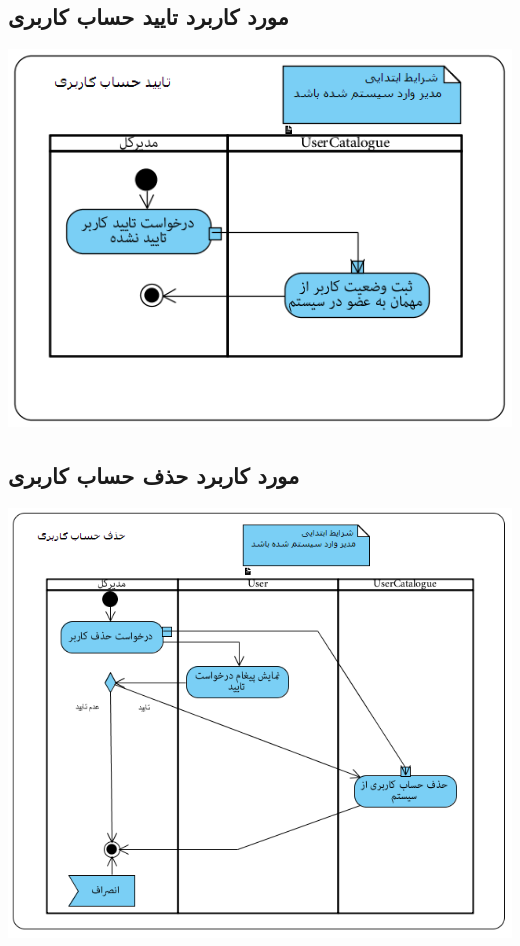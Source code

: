 \subsection*{مورد کاربرد تایید حساب کاربری}
\vspace{2cm}
\begin{center}
\includegraphics[width=\textwidth]{ActivityDiagramsWithSwimlanes/6.png}
\end{center}

\newpage
\vspace{2cm}
\subsection*{مورد کاربرد حذف حساب کاربری}
\vspace{2cm}
\begin{center}
\includegraphics[width=\textwidth]{ActivityDiagramsWithSwimlanes/7.png}
\end{center}

